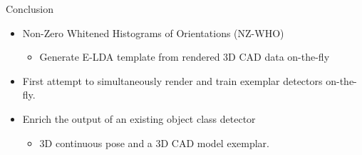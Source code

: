 \documentclass[serif,mathserif,final]{beamer}
\newcommand{\1}{\mathbb{I}} %
\begin{document}
\begin{frame}{}
\begin{columns}[t]
    \begin{column}{0.23\linewidth}
      \begin{block}{Conclusion}
        \begin{itemize}
          \item Non-Zero Whitened Histograms of Orientations (NZ-WHO)
            \begin{itemize}
              \item Generate E-LDA template from rendered 3D CAD data {\color{red} on-the-fly}
            \end{itemize}
          \item First attempt to simultaneously render and train exemplar detectors on-the-fly.
          \item Enrich the output of an existing object class detector
            \begin{itemize}
              \item 3D continuous pose and a 3D CAD model exemplar.
            \end{itemize}
        \end{itemize}
      \end{block}


    \end{column}%
  \end{columns}






\end{frame}
\end{document}
